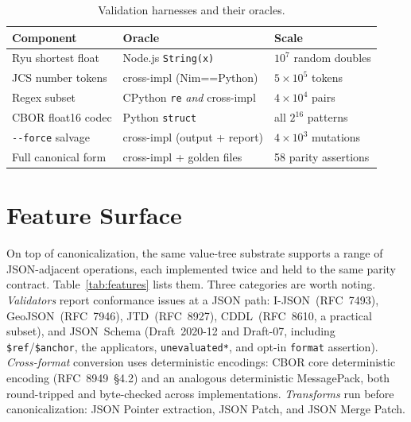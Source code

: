 \documentclass[11pt]{article}
\newcommand{\code}[1]{\texttt{#1}}
\begin{document}
\begin{table}[t]
\centering
\caption{Validation harnesses and their oracles.}
\label{tab:validation}
\small
\begin{tabular}{@{}lll@{}}
\toprule
Component & Oracle & Scale \\
\midrule
Ryu shortest float & Node.js \code{String(x)} & $10^7$ random doubles \\
JCS number tokens & cross-impl (Nim==Python) & $5\times10^5$ tokens \\
Regex subset & CPython \code{re} \emph{and} cross-impl & $4\times10^4$ pairs \\
CBOR float16 codec & Python \code{struct} & all $2^{16}$ patterns \\
\code{-{}-force} salvage & cross-impl (output + report) & $4\times10^3$ mutations \\
Full canonical form & cross-impl + golden files & 58 parity assertions \\
\bottomrule
\end{tabular}
\end{table}

\section{Feature Surface}\label{sec:features}

On top of canonicalization, the same value-tree substrate supports a range of
JSON-adjacent operations, each implemented twice and held to the same parity
contract. Table~\ref{tab:features} lists them. Three categories are worth
noting. \emph{Validators} report conformance issues at a JSON path:
I-JSON~(RFC~7493), GeoJSON~(RFC~7946), JTD~(RFC~8927), CDDL~(RFC~8610, a
practical subset), and JSON~Schema (Draft~2020-12 and Draft-07, including
\code{\$ref}/\code{\$anchor}, the applicators, \code{unevaluated*}, and opt-in
\code{format} assertion). \emph{Cross-format} conversion uses deterministic
encodings: CBOR core deterministic encoding (RFC~8949~\S4.2) and an analogous
deterministic MessagePack, both round-tripped and byte-checked across
implementations. \emph{Transforms} run before canonicalization: JSON Pointer
extraction, JSON Patch, and JSON Merge Patch.
\end{document}

